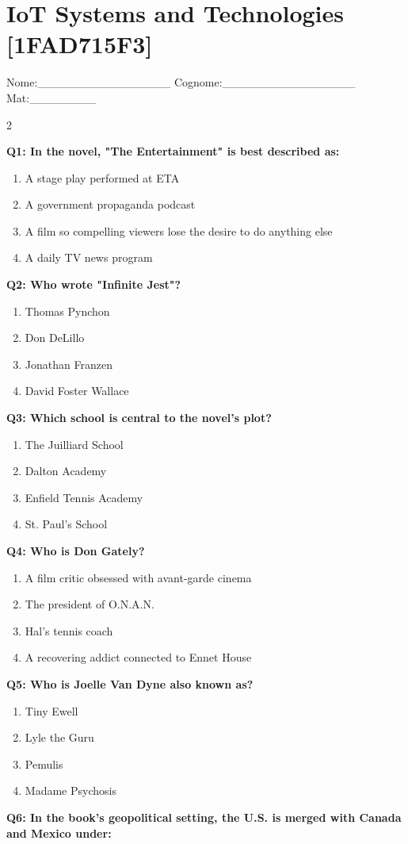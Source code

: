 \documentclass[10pt]{article}
\begin{document}
\section*{IoT Systems and Technologies \footnotesize [1FAD715F3]}
{\footnotesize Nome:\_\_\_\_\_\_\_\_\_\_\_\_\_\_\_\_ Cognome:\_\_\_\_\_\_\_\_\_\_\_\_\_\_\_\_ Mat:\_\_\_\_\_\_\_\_}
\begin{multicols}{2}

\textbf{Q1: In the novel, "The Entertainment" is best described as:}

\begin{enumerate}[label=\arabic*.]
\item A stage play performed at ETA
\item A government propaganda podcast
\item A film so compelling viewers lose the desire to do anything else
\item A daily TV news program
\end{enumerate}
\textbf{Q2: Who wrote "Infinite Jest"?}

\begin{enumerate}[label=\arabic*.]
\item Thomas Pynchon
\item Don DeLillo
\item Jonathan Franzen
\item David Foster Wallace
\end{enumerate}
\textbf{Q3: Which school is central to the novel's plot?}

\begin{enumerate}[label=\arabic*.]
\item The Juilliard School
\item Dalton Academy
\item Enfield Tennis Academy
\item St. Paul's School
\end{enumerate}
\textbf{Q4: Who is Don Gately?}

\begin{enumerate}[label=\arabic*.]
\item A film critic obsessed with avant-garde cinema
\item The president of O.N.A.N.
\item Hal's tennis coach
\item A recovering addict connected to Ennet House
\end{enumerate}
\textbf{Q5: Who is Joelle Van Dyne also known as?}

\begin{enumerate}[label=\arabic*.]
\item Tiny Ewell
\item Lyle the Guru
\item Pemulis
\item Madame Psychosis
\end{enumerate}
\textbf{Q6: In the book's geopolitical setting, the U.S. is merged with Canada and Mexico under:}


\end{multicols}
\end{document}
